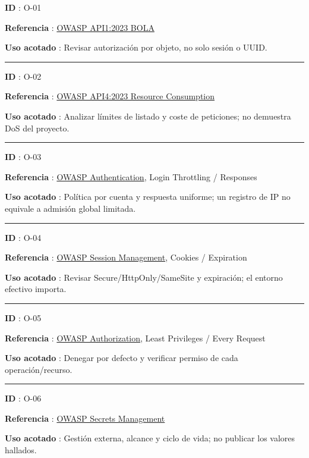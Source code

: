 \documentclass[12pt,a4paper]{report}
\begin{document}
\textbf{ID }: O-01

\textbf{Referencia
}: \href{https://api-security.owasp.org/editions/2023/en/0xa1-broken-object-level-authorization/}{OWASP
API1:2023 BOLA}

\textbf{Uso acotado }: Revisar autorización por objeto, no solo sesión o
UUID.

\medskip\hrule\medskip

\textbf{ID }: O-02

\textbf{Referencia
}: \href{https://api-security.owasp.org/editions/2023/en/0xa4-unrestricted-resource-consumption/}{OWASP
API4:2023 Resource Consumption}

\textbf{Uso acotado }: Analizar límites de listado y coste de
peticiones; no demuestra DoS del proyecto.

\medskip\hrule\medskip

\textbf{ID }: O-03

\textbf{Referencia
}: \href{https://cheatsheetseries.owasp.org/cheatsheets/Authentication_Cheat_Sheet.html}{OWASP
Authentication}, Login Throttling / Responses

\textbf{Uso acotado }: Política por cuenta y respuesta uniforme; un
registro de IP no equivale a admisión global limitada.

\medskip\hrule\medskip

\textbf{ID }: O-04

\textbf{Referencia
}: \href{https://cheatsheetseries.owasp.org/cheatsheets/Session_Management_Cheat_Sheet.html}{OWASP
Session Management}, Cookies / Expiration

\textbf{Uso acotado }: Revisar Secure/HttpOnly/SameSite y expiración; el
entorno efectivo importa.

\medskip\hrule\medskip

\textbf{ID }: O-05

\textbf{Referencia
}: \href{https://cheatsheetseries.owasp.org/cheatsheets/Authorization_Cheat_Sheet.html}{OWASP
Authorization}, Least Privileges / Every Request

\textbf{Uso acotado }: Denegar por defecto y verificar permiso de cada
operación/recurso.

\medskip\hrule\medskip

\textbf{ID }: O-06

\textbf{Referencia
}: \href{https://cheatsheetseries.owasp.org/cheatsheets/Secrets_Management_Cheat_Sheet.html}{OWASP
Secrets Management}

\textbf{Uso acotado }: Gestión externa, alcance y ciclo de vida; no
publicar los valores hallados.
\end{document}
